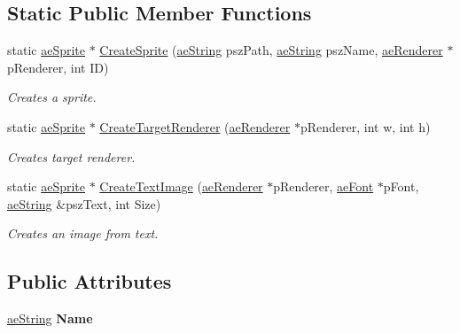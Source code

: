 \subsection*{Static Public Member Functions}
\begin{DoxyCompactItemize}
\item 
static \hyperlink{classae_core_1_1ae_sprite}{ae\+Sprite} $\ast$ \hyperlink{classae_core_1_1ae_sprite_a21ae55423867b80c2e8db783cfdbaad6}{Create\+Sprite} (\hyperlink{namespaceae_core_ad6f85aacc0d1fdd85e458e2413e60010}{ae\+String} psz\+Path, \hyperlink{namespaceae_core_ad6f85aacc0d1fdd85e458e2413e60010}{ae\+String} psz\+Name, \hyperlink{classae_core_1_1ae_renderer}{ae\+Renderer} $\ast$p\+Renderer, int ID)
\begin{DoxyCompactList}\small\item\em Creates a sprite. \end{DoxyCompactList}\item 
static \hyperlink{classae_core_1_1ae_sprite}{ae\+Sprite} $\ast$ \hyperlink{classae_core_1_1ae_sprite_addce4be06369bd7996a06f279292329c}{Create\+Target\+Renderer} (\hyperlink{classae_core_1_1ae_renderer}{ae\+Renderer} $\ast$p\+Renderer, int w, int h)
\begin{DoxyCompactList}\small\item\em Creates target renderer. \end{DoxyCompactList}\item 
static \hyperlink{classae_core_1_1ae_sprite}{ae\+Sprite} $\ast$ \hyperlink{classae_core_1_1ae_sprite_a12ba14c6c0c3a429334faee5ce9ff23f}{Create\+Text\+Image} (\hyperlink{classae_core_1_1ae_renderer}{ae\+Renderer} $\ast$p\+Renderer, \hyperlink{classae_core_1_1ae_font}{ae\+Font} $\ast$p\+Font, \hyperlink{namespaceae_core_ad6f85aacc0d1fdd85e458e2413e60010}{ae\+String} \&psz\+Text, int Size)
\begin{DoxyCompactList}\small\item\em Creates an image from text. \end{DoxyCompactList}\end{DoxyCompactItemize}
\subsection*{Public Attributes}
\begin{DoxyCompactItemize}
\item 
\hyperlink{namespaceae_core_ad6f85aacc0d1fdd85e458e2413e60010}{ae\+String} {\bfseries Name}\hypertarget{classae_core_1_1ae_sprite_aef9b53797a7e7f79533b59b69f5957fb}{}\label{classae_core_1_1ae_sprite_aef9b53797a7e7f79533b59b69f5957fb}

\end{DoxyCompactItemize}
